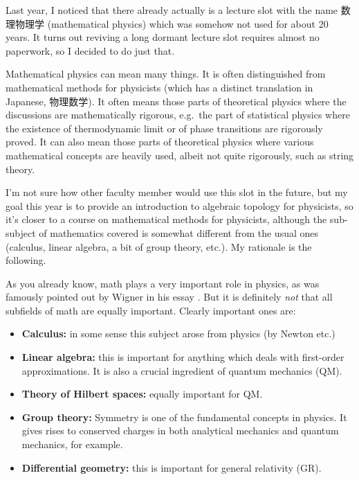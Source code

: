 \documentclass[12pt]{article}
\numberwithin{equation}{section}
\begin{document}
Last year, I noticed that there already actually is a lecture slot with the name
数理物理学 (mathematical physics)
which was somehow not used for about 20 years.
It turns out reviving a long dormant lecture slot requires almost no paperwork,
so I decided to do just that.

Mathematical physics can mean many things. 
It is often distinguished from mathematical methods for physicists (which has a distinct translation in Japanese, 物理数学).
It often means those parts of theoretical physics where the discussions are mathematically rigorous,
e.g.~the part of statistical physics where the existence of thermodynamic limit or of phase transitions are rigorously proved.
It can also mean those parts of theoretical physics where various mathematical concepts are heavily used, albeit not quite rigorously,
such as string theory.


I'm not sure how other faculty member would use this slot in the future,
but my goal this year is to provide an introduction to algebraic topology for physicists,
so it's closer to a course on mathematical methods for physicists,
although the sub-subject of mathematics covered is somewhat different from the usual ones (calculus, linear algebra, a bit of group theory, etc.).
My rationale is the following.

As you already know, math plays a very important role in physics, 
as was famously pointed out by Wigner in his essay \cite{WignerUnreasonable}.
But it is definitely \emph{not} that all subfields of math are equally important.
Clearly important ones are:
\begin{itemize}
  \item \textbf{Calculus:} in some sense this subject arose from physics (by Newton etc.)
  \item \textbf{Linear algebra:} this is important for anything which deals with first-order approximations. 
  It is also a crucial ingredient of quantum mechanics (QM).
  \item \textbf{Theory of Hilbert spaces:} equally important for QM.
  \item \textbf{Group theory:} Symmetry is one of the fundamental concepts in physics. It gives rises to conserved charges in both analytical mechanics and quantum mechanics, for example.
  \item \textbf{Differential geometry:} this is important for general relativity (GR).
\end{itemize}
\end{document}

